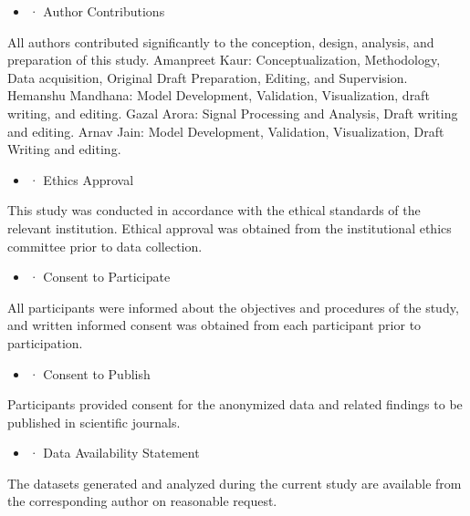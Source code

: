 \documentclass{elektr}
\begin{document}
\begin{itemize}
	\item · Author Contributions
\end{itemize}
All authors contributed significantly to the conception, design, analysis, and preparation of this study.
Amanpreet Kaur: Conceptualization, Methodology, Data acquisition, Original Draft Preparation, Editing, and Supervision.
Hemanshu Mandhana: Model Development, Validation, Visualization, draft writing, and editing.
Gazal Arora: Signal Processing and Analysis, Draft writing and editing.
Arnav Jain: Model Development, Validation, Visualization, Draft Writing and editing.
\begin{itemize}
	\item · Ethics Approval
\end{itemize}
This study was conducted in accordance with the ethical standards of the relevant institution. Ethical approval was obtained from the institutional ethics committee prior to data collection.

\begin{itemize}
	\item · Consent to Participate
\end{itemize}
All participants were informed about the objectives and procedures of the study, and written informed consent was obtained from each participant prior to participation.

\begin{itemize}
	\item · Consent to Publish
\end{itemize}
Participants provided consent for the anonymized data and related findings to be published in scientific journals.

\begin{itemize}
	\item · Data Availability Statement
\end{itemize}
The datasets generated and analyzed during the current study are available from the corresponding author on reasonable request.







\end{document}
